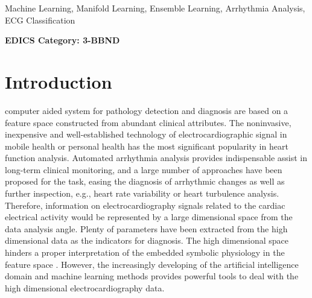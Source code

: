 \documentclass[journal]{IEEEtran}
\begin{document}
\begin{IEEEkeywords}
Machine Learning, Manifold Learning, Ensemble Learning, Arrhythmia Analysis, ECG Classification
\end{IEEEkeywords}






 \ifCLASSOPTIONpeerreview
 \begin{center} \bfseries EDICS Category: 3-BBND \end{center}
 \fi
%
\IEEEpeerreviewmaketitle



\section{Introduction}
% 
% 
% 
% 
 computer aided system for pathology detection and diagnosis are based on a feature space constructed from abundant clinical attributes.
The noninvasive, inexpensive and well-established technology of electrocardiographic signal in mobile health or personal health has the most significant popularity in heart function analysis. 
Automated arrhythmia analysis provides indispensable assist in long-term clinical monitoring, and a large number of approaches have been proposed for the task, easing the diagnosis of arrhythmic changes as well as further inspection, e.g., heart rate variability or heart turbulence analysis.
Therefore, information on electrocardiography signals related to the cardiac electrical activity would be represented by a large dimensional space from the data analysis angle.
Plenty of parameters have been extracted from the high dimensional data as the indicators for diagnosis. 
The high dimensional space hinders a proper interpretation of the embedded symbolic physiology in the feature space \cite{delgado2009dimensionality}.
However, the increasingly developing of the artificial intelligence domain and machine learning methods provides powerful tools to deal with the high dimensional electrocardiography data.
\end{document}
